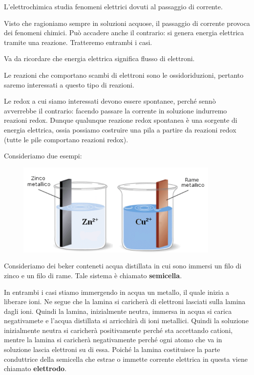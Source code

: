 L'elettrochimica studia fenomeni elettrici dovuti al passaggio di corrente.

Visto che ragioniamo sempre in soluzioni acquose, il passaggio di corrente provoca dei fenomeni chimici. Può accadere anche il contrario: si genera energia elettrica tramite una reazione. Tratteremo entrambi i casi.

\vspace{0.2cm}Va da ricordare che energia elettrica significa flusso di elettroni.

Le reazioni che comportano scambi di elettroni sono le ossidoriduzioni, pertanto saremo interessati a questo tipo di reazioni.

Le redox a cui siamo interessati devono essere spontanee, perché sennò avverrebbe il contrario: facendo passare la corrente in soluzione indurremo reazioni redox. Dunque qualunque reazione redox spontanea è una sorgente di energia elettrica, ossia possiamo costruire una pila a partire da reazioni redox (tutte le pile comportano reazioni redox).

Consideriamo due esempi:

\begin{figure}[H]
    \centering
    \includegraphics[width=10cm]{immagini/piastre_metalliche.png}
\end{figure}

Consideriamo dei beker conteneti acqua distillata in cui sono immersi un filo di zinco e un filo di rame. Tale sistema è chiamato \textbf{semicella}.

In entrambi i casi stiamo immergendo in acqua un metallo, il quale inizia a liberare ioni. Ne segue che la lamina si caricherà di elettroni lasciati sulla lamina dagli ioni. Quindi la lamina, inizialmente neutra, immersa in acqua si carica negativamete e l'acqua distillata si arricchirà di ioni metallici. Quindi la soluzione inizialmente neutra si caricherà positivamente perché sta accettando cationi, mentre la lamina si caricherà negativamente perché ogni atomo che va in soluzione lascia elettroni su di essa. Poiché la lamina costituisce la parte conduttrice della semicella che estrae o immette corrente elettrica in questa viene chiamato \textbf{elettrodo}.

